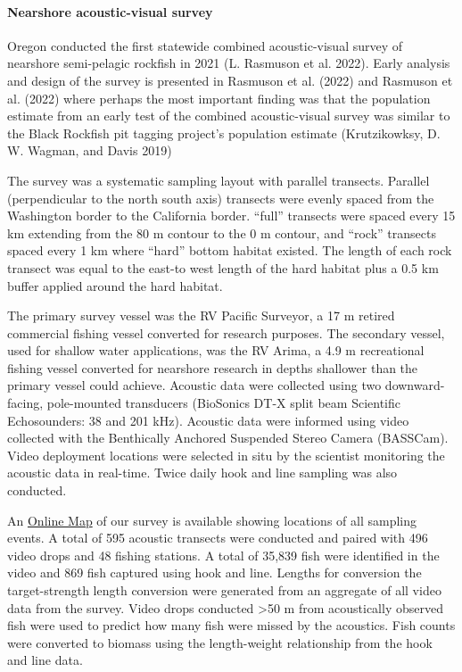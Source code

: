 \documentclass[11pt,
  english,
  letterpaper,
]{article}
\begin{document}
\hypertarget{nearshore-acoustic-visual-survey}{%
\paragraph{Nearshore acoustic-visual survey}\label{nearshore-acoustic-visual-survey}}

Oregon conducted the first statewide combined acoustic-visual survey of nearshore semi-pelagic rockfish in 2021 (L. Rasmuson et al. 2022). Early analysis and design of the survey is presented in Rasmuson et al. (2022) and Rasmuson et al. (2022) where perhaps the most important finding was that the population estimate from an early test of the combined acoustic-visual survey was similar to the Black Rockfish pit tagging project's population estimate (Krutzikowksy, D. W. Wagman, and Davis 2019)

The survey was a systematic sampling layout with parallel transects. Parallel (perpendicular to the north south axis) transects were evenly spaced from the Washington border to the California border. ``full'' transects were spaced every 15 km extending from the 80 m contour to the 0 m contour, and ``rock'' transects spaced every 1 km where ``hard'' bottom habitat existed. The length of each rock transect was equal to the east-to west length of the hard habitat plus a 0.5 km buffer applied around the hard habitat.

The primary survey vessel was the RV Pacific Surveyor, a 17 m retired commercial fishing vessel converted for research purposes. The secondary vessel, used for shallow water applications, was the RV Arima, a 4.9 m recreational fishing vessel converted for nearshore research in depths shallower than the primary vessel could achieve. Acoustic data were collected using two downward-facing, pole-mounted transducers (BioSonics DT-X split beam Scientific Echosounders: 38 and 201 kHz). Acoustic data were informed using video collected with the Benthically Anchored Suspended Stereo Camera (BASSCam). Video deployment locations were selected in situ by the scientist monitoring the acoustic data in real-time. Twice daily hook and line sampling was also conducted.

An \href{https://www.arcgis.com/apps/mapviewer/index.html?webmap=49e8f3a8079448c29a21d4384d2b50dd}{Online Map} of our survey is available showing locations of all sampling events. A total of 595 acoustic transects were conducted and paired with 496 video drops and 48 fishing stations. A total of 35,839 fish were identified in the video and 869 fish captured using hook and line. Lengths for conversion the target-strength length conversion were generated from an aggregate of all video data from the survey. Video drops conducted \textgreater50 m from acoustically observed fish were used to predict how many fish were missed by the acoustics. Fish counts were converted to biomass using the length-weight relationship from the hook and line data.
\end{document}
